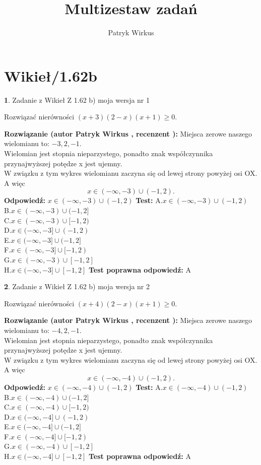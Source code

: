 \documentclass[12pt, a4paper]{article}
\title{Multizestaw zadań}
\author{Patryk Wirkus}
\date{}
\theoremstyle{definition} %
\newtheorem{zad}{}
\newcommand{\kategoria}[1]{\section{#1}}
\newcommand{\zadStart}[1]{\begin{zad}#1\newline}
\newcommand{\zadStop}{\end{zad}}
\newcommand{\rozwStart}[2]{\noindent \textbf{Rozwiązanie (autor #1 , recenzent #2): }\newline}
\newcommand{\rozwStop}{\newline}
\newcommand{\odpStart}{\noindent \textbf{Odpowiedź:}\newline}
\newcommand{\odpStop}{\newline}
\newcommand{\testStart}{\noindent \textbf{Test:}\newline}
\newcommand{\testStop}{\newline}
\newcommand{\kluczStart}{\noindent \textbf{Test poprawna odpowiedź:}\newline}
\newcommand{\kluczStop}{\newline}
\begin{document}
\maketitle

\kategoria{Wikieł/1.62b}


\zadStart{Zadanie z Wikieł Z 1.62 b) moja wersja nr 1}

Rozwiązać nierówności $(x+3)(2-x)(x+1)\ge0$.
\zadStop
\rozwStart{Patryk Wirkus}{}
Miejsca zerowe naszego wielomianu to: $-3, 2, -1$.\\
Wielomian jest stopnia nieparzystego, ponadto znak współczynnika przy\linebreak najwyższej potędze x jest ujemny.\\ W związku z tym wykres wielomianu zaczyna się od lewej strony powyżej osi OX. A więc $$x \in (-\infty,-3) \cup (-1,2).$$
\rozwStop
\odpStart
$x \in (-\infty,-3) \cup (-1,2)$
\odpStop
\testStart
A.$x \in (-\infty,-3) \cup (-1,2)$\\
B.$x \in (-\infty,-3) \cup (-1,2]$\\
C.$x \in (-\infty,-3) \cup [-1,2)$\\
D.$x \in (-\infty,-3] \cup (-1,2)$\\
E.$x \in (-\infty,-3] \cup (-1,2]$\\
F.$x \in (-\infty,-3] \cup [-1,2)$\\
G.$x \in (-\infty,-3) \cup [-1,2]$\\
H.$x \in (-\infty,-3] \cup [-1,2]$
\testStop
\kluczStart
A
\kluczStop



\zadStart{Zadanie z Wikieł Z 1.62 b) moja wersja nr 2}

Rozwiązać nierówności $(x+4)(2-x)(x+1)\ge0$.
\zadStop
\rozwStart{Patryk Wirkus}{}
Miejsca zerowe naszego wielomianu to: $-4, 2, -1$.\\
Wielomian jest stopnia nieparzystego, ponadto znak współczynnika przy\linebreak najwyższej potędze x jest ujemny.\\ W związku z tym wykres wielomianu zaczyna się od lewej strony powyżej osi OX. A więc $$x \in (-\infty,-4) \cup (-1,2).$$
\rozwStop
\odpStart
$x \in (-\infty,-4) \cup (-1,2)$
\odpStop
\testStart
A.$x \in (-\infty,-4) \cup (-1,2)$\\
B.$x \in (-\infty,-4) \cup (-1,2]$\\
C.$x \in (-\infty,-4) \cup [-1,2)$\\
D.$x \in (-\infty,-4] \cup (-1,2)$\\
E.$x \in (-\infty,-4] \cup (-1,2]$\\
F.$x \in (-\infty,-4] \cup [-1,2)$\\
G.$x \in (-\infty,-4) \cup [-1,2]$\\
H.$x \in (-\infty,-4] \cup [-1,2]$
\testStop
\kluczStart
A
\kluczStop
\end{document}
